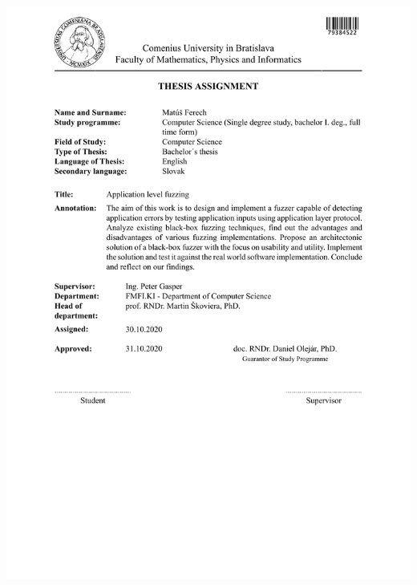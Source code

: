 \documentclass[12pt, twoside]{book}
\begin{document}
\newpage
\thispagestyle{empty}
\hspace{-2cm}\includegraphics[width=1.1\textwidth]{images/assignment}
\end{document}
